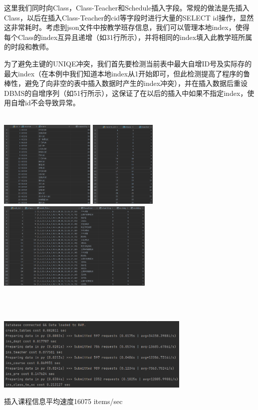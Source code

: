 \vspace{-3em}\par
这里我们同时向Class，Class-Teacher和Schedule插入字段。常规的做法是先插入Class，以后在插入Class-Teacher的cid等字段时进行大量的SELECT id操作，显然这非常耗时。考虑到json文件中按教学班存信息，我们可以管理本地index，使得每个Class的index互异且递增（如31行所示），并将相同的index填入此教学班所属的时段和教师。
\par 为了避免主键的UNIQE冲突，我们首先要检测当前表中最大自增ID号及实际存的最大index（在本例中我们知道本地index从1开始即可，但此检测提高了程序的鲁棒性，避免了向非空的表中插入数据时产生的index冲突），并在插入数据后重设DBMS的自增序列（如51行所示），这保证了在以后的插入中如果不指定index，使用自增id不会导致异常。\\~\\
\centerline{\includegraphics[height=4.2cm]{dta/class.png}\quad
	\includegraphics[height=4.2cm]{dta/ct.png}\quad
	\includegraphics[height=4.2cm]{dta/sch.png}}\\~\\
\centerline{\includegraphics[height=3.5cm]{dta/cisp.png}}
\scriptsize\centerline{插入课程信息平均速度16075 items/sec}\normalsize

